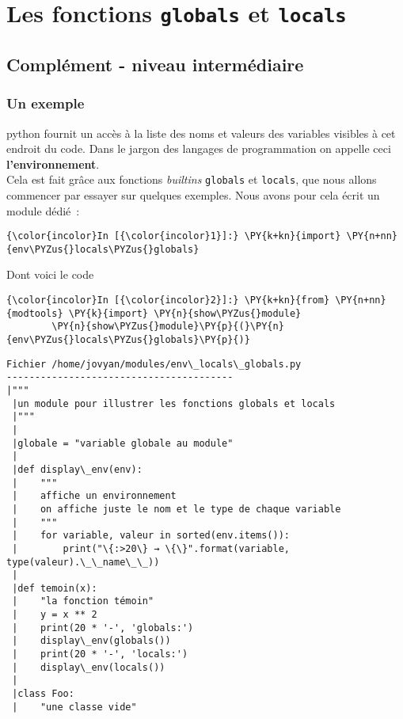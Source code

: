     \hypertarget{les-fonctions-globals-et-locals}{%
\section{\texorpdfstring{Les fonctions \texttt{globals} et
\texttt{locals}}{Les fonctions globals et locals}}\label{les-fonctions-globals-et-locals}}

    \hypertarget{compluxe9ment---niveau-intermuxe9diaire}{%
\subsection{Complément - niveau
intermédiaire}\label{compluxe9ment---niveau-intermuxe9diaire}}

    \hypertarget{un-exemple}{%
\subsubsection{Un exemple}\label{un-exemple}}

    python fournit un accès à la liste des noms et valeurs des variables
visibles à cet endroit du code. Dans le jargon des langages de
programmation on appelle ceci \textbf{l'environnement}.\\

Cela est fait grâce aux fonctions \emph{builtins} \texttt{globals} et
\texttt{locals}, que nous allons commencer par essayer sur quelques
exemples. Nous avons pour cela écrit un module dédié~:

    \begin{Verbatim}[commandchars=\\\{\}]
{\color{incolor}In [{\color{incolor}1}]:} \PY{k+kn}{import} \PY{n+nn}{env\PYZus{}locals\PYZus{}globals}
\end{Verbatim}


    Dont voici le code

    \begin{Verbatim}[commandchars=\\\{\}]
{\color{incolor}In [{\color{incolor}2}]:} \PY{k+kn}{from} \PY{n+nn}{modtools} \PY{k}{import} \PY{n}{show\PYZus{}module}
        \PY{n}{show\PYZus{}module}\PY{p}{(}\PY{n}{env\PYZus{}locals\PYZus{}globals}\PY{p}{)}
\end{Verbatim}


    \begin{Verbatim}[commandchars=\\\{\}]
Fichier /home/jovyan/modules/env\_locals\_globals.py
----------------------------------------
|"""
 |un module pour illustrer les fonctions globals et locals
 |"""
 |
 |globale = "variable globale au module"
 |
 |def display\_env(env):
 |    """
 |    affiche un environnement
 |    on affiche juste le nom et le type de chaque variable
 |    """
 |    for variable, valeur in sorted(env.items()):
 |        print("\{:>20\} → \{\}".format(variable, type(valeur).\_\_name\_\_))
 |
 |def temoin(x):
 |    "la fonction témoin"
 |    y = x ** 2
 |    print(20 * '-', 'globals:')
 |    display\_env(globals())
 |    print(20 * '-', 'locals:')
 |    display\_env(locals())
 |
 |class Foo:
 |    "une classe vide"
 
    \end{Verbatim}

